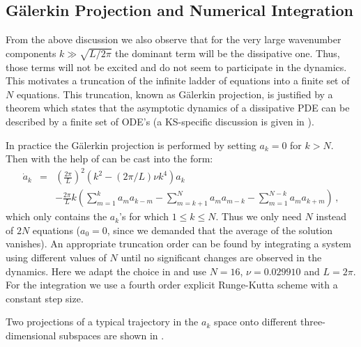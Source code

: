 \documentclass[pre,preprint,groupedaddress,showpacs,showkeys]{revtex4}
\begin{document}
\subsection{G\"{a}lerkin Projection and Numerical Integration}
\label{sec:truncation}

 From the above discussion we also observe that for the very large
 wavenumber components $k\gg\sqrt{L/2\pi}$  the dominant term will be
 the dissipative one. Thus, those terms will not be
 excited and do not seem to participate in the dynamics.
 This motivates a truncation of the infinite ladder of equations
  into a finite set of $N$ equations. This
 truncation, known as G\"{a}lerkin projection, is justified by a theorem
 which states that the asymptotic dynamics of a dissipative PDE can
 be described by a finite set of ODE's (a KS-specific discussion is
 given in \cite{Foias:88}).

 In practice the G\"{a}lerkin projection is performed by setting $a_k=0$ for
 $k>N$. Then  with the help of 
 can be cast into the form:
 \begin{eqnarray}
  \dot{a}_k & = & \left(\frac{2\pi}{L}\right)^2\left(k^2- \left(2\pi/L\right)\nu k^4\right)a_k  \nonumber \\
            &  & - \frac{2\pi}{L} k\left( \sum_{m=1}^{k}a_m a_{k-m}-\sum_{m=k+1}^{N}a_m a_{m-k}
                    -\sum_{m=1}^{N-k}a_m a_{k+m}\right) \, ,
  \label{eq:Fcoef Trunc}
 \end{eqnarray}
 which only contains the $a_k$'s for which $1 \leq k \leq N$. Thus we only need $N$
 instead of $2N$ equations ($a_0=0$, since we demanded that the average of the solution
 vanishes). An appropriate truncation order can be found by integrating
 a system using different values of $N$ until no significant changes
 are observed in the dynamics. Here we adapt the choice in
 \cite{Christiansen:97} and use $N=16$,
 $\nu=0.029910$ and $L=2\pi$. For the integration we use a fourth
 order explicit Runge-Kutta scheme with a constant step size.

 Two projections of a typical trajectory in the $a_k$ space onto different three-dimensional
 subspaces are shown in  .
\end{document}
